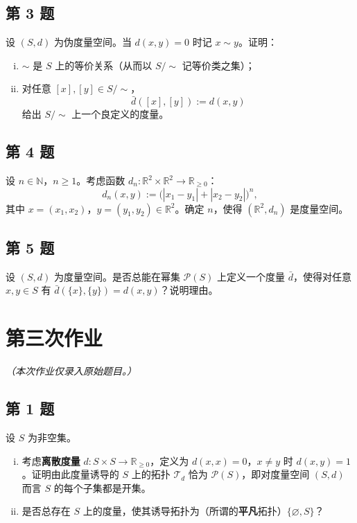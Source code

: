 \documentclass[11pt,a4paper]{article}
\newcommand{\R}{\mathbb{R}}
\newcommand{\N}{\mathbb{N}}
\theoremstyle{definition}
\begin{document}
\subsection{第 3 题}

设 $(S, d)$ 为伪度量空间。当 $d(x, y) = 0$ 时记 $x \sim y$。证明：
\begin{enumerate}[(i)]
  \item $\sim$ 是 $S$ 上的等价关系（从而以 $S/\!\sim$ 记等价类之集）；
  \item 对任意 $[x], [y] \in S/\!\sim$，
    \[
      \bar d([x], [y]) := d(x, y)
    \]
    给出 $S/\!\sim$ 上一个良定义的度量。
\end{enumerate}

\subsection{第 4 题}

设 $n \in \N$，$n \ge 1$。考虑函数 $d_n : \R^2 \times \R^2 \to \R_{\ge 0}$：
\[
  d_n(x, y) := \bigl(|x_1 - y_1| + |x_2 - y_2|\bigr)^n,
\]
其中 $x = (x_1, x_2)$，$y = (y_1, y_2) \in \R^2$。确定 $n$，使得 $(\R^2, d_n)$ 是度量空间。

\subsection{第 5 题}

设 $(S, d)$ 为度量空间。是否总能在幂集 $\mathcal{P}(S)$ 上定义一个度量 $\bar d$，使得对任意 $x, y \in S$ 有 $\bar d(\{x\}, \{y\}) = d(x, y)$？说明理由。

\section{第三次作业}

\textit{（本次作业仅录入原始题目。）}

\subsection{第 1 题}

设 $S$ 为非空集。
\begin{enumerate}[(i)]
  \item 考虑\textbf{离散度量} $d : S \times S \to \R_{\ge 0}$，定义为 $d(x, x) = 0$，$x \ne y$ 时 $d(x, y) = 1$。证明由此度量诱导的 $S$ 上的拓扑 $\mathcal{T}_d$ 恰为 $\mathcal{P}(S)$，即对度量空间 $(S, d)$ 而言 $S$ 的每个子集都是开集。
  \item 是否总存在 $S$ 上的度量，使其诱导拓扑为（所谓的\textbf{平凡}拓扑）$\{\varnothing, S\}$？
\end{enumerate}
\end{document}
